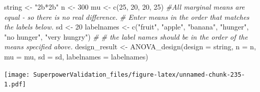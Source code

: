 \documentclass[
]{book}
\newenvironment{Shaded}{\begin{snugshade}}{\end{snugshade}}
\newcommand{\AttributeTok}[1]{\textcolor[rgb]{0.77,0.63,0.00}{#1}}
\newcommand{\CommentTok}[1]{\textcolor[rgb]{0.56,0.35,0.01}{\textit{#1}}}
\newcommand{\ConstantTok}[1]{\textcolor[rgb]{0.00,0.00,0.00}{#1}}
\newcommand{\DecValTok}[1]{\textcolor[rgb]{0.00,0.00,0.81}{#1}}
\newcommand{\FloatTok}[1]{\textcolor[rgb]{0.00,0.00,0.81}{#1}}
\newcommand{\FunctionTok}[1]{\textcolor[rgb]{0.00,0.00,0.00}{#1}}
\newcommand{\NormalTok}[1]{#1}
\newcommand{\OtherTok}[1]{\textcolor[rgb]{0.56,0.35,0.01}{#1}}
\newcommand{\SpecialCharTok}[1]{\textcolor[rgb]{0.00,0.00,0.00}{#1}}
\newcommand{\StringTok}[1]{\textcolor[rgb]{0.31,0.60,0.02}{#1}}
\begin{document}
\begin{Shaded}
\begin{Highlighting}[]
\NormalTok{string }\OtherTok{\textless{}{-}} \StringTok{"2b*2b"}
\NormalTok{n }\OtherTok{\textless{}{-}} \DecValTok{300}
\NormalTok{mu }\OtherTok{\textless{}{-}} \FunctionTok{c}\NormalTok{(}\DecValTok{25}\NormalTok{, }\DecValTok{20}\NormalTok{, }\DecValTok{20}\NormalTok{, }\DecValTok{25}\NormalTok{) }\CommentTok{\#All marginal means are equal {-} so there is no real difference.}
\CommentTok{\# Enter means in the order that matches the labels below.}
\NormalTok{sd }\OtherTok{\textless{}{-}} \DecValTok{20}
\NormalTok{labelnames }\OtherTok{\textless{}{-}} \FunctionTok{c}\NormalTok{(}\StringTok{"fruit"}\NormalTok{, }\StringTok{"apple"}\NormalTok{, }\StringTok{"banana"}\NormalTok{, }
                \StringTok{"hunger"}\NormalTok{, }\StringTok{"no hunger"}\NormalTok{, }\StringTok{"very hungry"}\NormalTok{) }\CommentTok{\#}
\CommentTok{\# the label names should be in the order of the means specified above.}
\NormalTok{design\_result }\OtherTok{\textless{}{-}} \FunctionTok{ANOVA\_design}\NormalTok{(}\AttributeTok{design =}\NormalTok{ string,}
                   \AttributeTok{n =}\NormalTok{ n, }
                   \AttributeTok{mu =}\NormalTok{ mu, }
                   \AttributeTok{sd =}\NormalTok{ sd, }
                   \AttributeTok{labelnames =}\NormalTok{ labelnames)}
\end{Highlighting}
\end{Shaded}

\texttt{[image: SuperpowerValidation\_files/figure-latex/unnamed-chunk-235-1.pdf]}

\begin{Shaded}
\end{Shaded}
\end{document}
